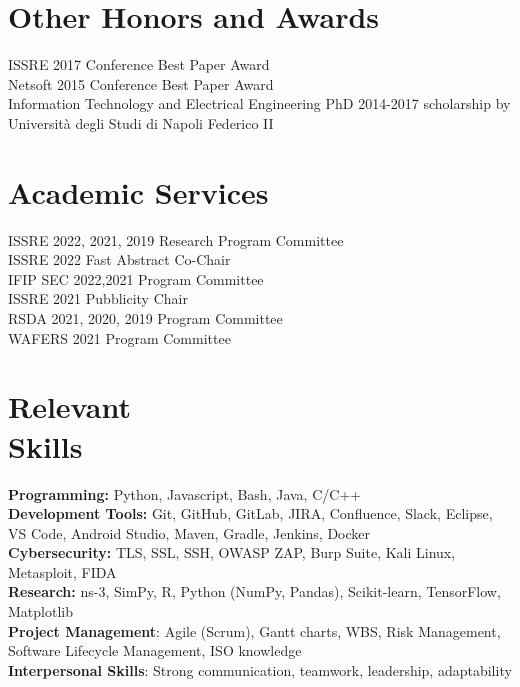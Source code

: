 \documentclass[margin,line]{resume}
\begin{document}
\begin{resume}
\section{\mysidestyle Other Honors and Awards}
ISSRE 2017 Conference Best Paper Award
\vspace{1mm}\\%
Netsoft 2015 Conference Best Paper Award
\vspace{1mm}\\%
Information Technology and Electrical Engineering PhD 2014-2017 scholarship by Universit\`a degli Studi di Napoli Federico II

\section{\mysidestyle Academic Services}
ISSRE 2022, 2021, 2019 Research Program Committee
\vspace{1mm}\\%
ISSRE 2022 Fast Abstract Co-Chair
\vspace{1mm}\\%
IFIP SEC 2022,2021 Program Committee
\vspace{1mm}\\%
ISSRE 2021	Pubblicity Chair
\vspace{1mm}\\%
RSDA 2021, 2020, 2019 Program Committee
\vspace{1mm}\\%
WAFERS 2021 Program Committee

\filbreak
\section{\mysidestyle Relevant\\Skills} 
\textbf{Programming:} Python, Javascript, Bash, Java, C/C++\vspace{2mm}\\
\textbf{Development Tools:} Git, GitHub, GitLab, JIRA, Confluence, Slack, Eclipse, VS Code, Android Studio, Maven, Gradle, Jenkins, Docker \vspace{2mm}\\
\textbf{Cybersecurity:} TLS, SSL, SSH, OWASP ZAP, Burp Suite, Kali Linux, Metasploit, FIDA  \vspace{2mm}\\
\textbf{Research:} ns-3, SimPy, R, Python (NumPy, Pandas), Scikit-learn, TensorFlow, Matplotlib  \vspace{2mm}\\
\textbf{Project Management}: Agile (Scrum), Gantt charts, WBS, Risk Management, Software Lifecycle Management, ISO knowledge \vspace{2mm}\\
\textbf{Interpersonal Skills}: Strong communication, teamwork, leadership, adaptability \vspace{2mm}\\


\end{resume}
\end{document}
